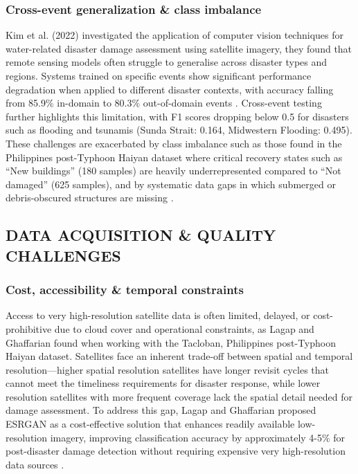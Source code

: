 \documentclass[conference,a4paper]{IEEEtran}
\begin{document}
\subsubsection{\textbf{Cross-event generalization \& class imbalance}}
Kim et al. (2022) investigated the application of computer vision techniques for water-related disaster damage assessment using satellite imagery, they found that remote sensing models often struggle to generalise across disaster types and regions. Systems trained on specific events show significant performance degradation when applied to different disaster contexts, with accuracy falling from 85.9\% in-domain to 80.3\% out-of-domain events \cite{kimDisasterAssessmentUsing2022}. Cross-event testing further highlights this limitation, with F1 scores dropping below 0.5 for disasters such as flooding and tsunamis (Sunda Strait: 0.164, Midwestern Flooding: 0.495). These challenges are exacerbated by class imbalance such as those found in the Philippines post-Typhoon Haiyan dataset where critical recovery states such as ``New buildings'' (180 samples) are heavily underrepresented compared to ``Not damaged'' (625 samples), and by systematic data gaps in which submerged or debris-obscured structures are missing \cite{lagapEnhancingPostDisasterDamage2025}.


\subsection{DATA ACQUISITION \& QUALITY CHALLENGES}

\subsubsection{\textbf{Cost, accessibility \& temporal constraints}}
Access to very high-resolution satellite data is often limited, delayed, or cost-prohibitive due to cloud cover and operational constraints, as Lagap and Ghaffarian found when working with the Tacloban, Philippines post-Typhoon Haiyan dataset. Satellites face an inherent trade-off between spatial and temporal resolution—higher spatial resolution satellites have longer revisit cycles that cannot meet the timeliness requirements for disaster response, while lower resolution satellites with more frequent coverage lack the spatial detail needed for damage assessment. To address this gap, Lagap and Ghaffarian proposed ESRGAN as a cost-effective solution that enhances readily available low-resolution imagery, improving classification accuracy by approximately 4-5\% for post-disaster damage detection without requiring expensive very high-resolution data sources \cite{lagapEnhancingPostDisasterDamage2025}.
\end{document}
